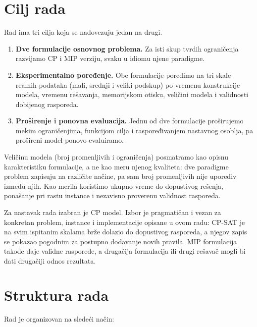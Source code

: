 \documentclass[12pt,oneside]{memoir}
\begin{document}
\section{Cilj rada}

Rad ima tri cilja koja se nadovezuju jedan na drugi.

\begin{enumerate}
\item \textbf{Dve formulacije osnovnog problema.} Za isti skup tvrdih
  ograničenja razvijamo CP i MIP verziju, svaku u idiomu njene
  paradigme.

\item \textbf{Eksperimentalno poređenje.} Obe formulacije poredimo na
  tri skale realnih podataka (mali, srednji i veliki podskup) po
  vremenu konstrukcije modela, vremenu rešavanja, memorijskom otisku,
  veličini modela i validnosti dobijenog rasporeda.

\item \textbf{Proširenje i ponovna evaluacija.} Jednu od dve
  formulacije proširujemo mekim ograničenjima, funkcijom cilja i
  raspoređivanjem nastavnog osoblja, pa prošireni model ponovo
  evaluiramo.
\end{enumerate}

Veličinu modela (broj promenljivih i ograničenja) posmatramo kao
opisnu karakteristiku formulacije, a ne kao meru njenog kvaliteta:
dve paradigme problem zapisuju na različite načine, pa
sam broj promenljivih nije uporediv između njih. Kao merila koristimo
ukupno vreme do dopustivog rešenja, ponašanje pri rastu instance i
nezavisno proverenu validnost rasporeda.

Za nastavak rada izabran je CP model. Izbor je pragmatičan i vezan za
konkretan problem, instance i implementacije opisane u ovom radu:
CP-SAT je na svim ispitanim skalama brže dolazio do dopustivog
rasporeda, a njegov zapis se pokazao pogodnim za postupno dodavanje
novih pravila. MIP formulacija takođe daje validne rasporede,
a drugačija formulacija ili drugi rešavač mogli bi dati drugačiji
odnos rezultata.

\section{Struktura rada}

Rad je organizovan na sledeći način:
\end{document}
